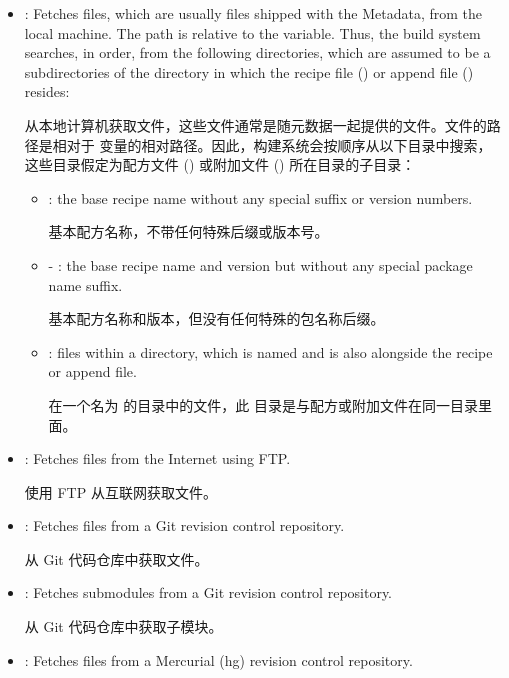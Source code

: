 {\begin{itemize}
\medskip
从 CVS 版本控制代码仓库获取文件。

\item {}: Fetches files, which are usually files shipped with the Metadata, from the local machine. The path is relative to the  variable. Thus, the build system searches, in order, from the following directories, which are assumed to be a subdirectories of the directory in which the recipe file () or append file () resides:

\medskip
从本地计算机获取文件，这些文件通常是随元数据一起提供的文件。文件的路径是相对于  变量的相对路径。因此，构建系统会按顺序从以下目录中搜索，这些目录假定为配方文件 () 或附加文件 () 所在目录的子目录：

\medskip
\begin{itemize}
\setlength\itemsep{1.0em}
\item {}: the base recipe name without any special suffix or version numbers.

\medskip
基本配方名称，不带任何特殊后缀或版本号。

\item {} - : the base recipe name and version but without any special package name suffix.

\medskip
基本配方名称和版本，但没有任何特殊的包名称后缀。

\item {}: files within a directory, which is named  and is also alongside the recipe or append file.

\medskip
在一个名为  的目录中的文件，此  目录是与配方或附加文件在同一目录里面。
\end{itemize}

\item {}: Fetches files from the Internet using FTP.

\medskip
使用 FTP 从互联网获取文件。

\item {}: Fetches files from a Git revision control repository.

\medskip
从 Git 代码仓库中获取文件。

\item {}: Fetches submodules from a Git revision control repository.

\medskip
从 Git 代码仓库中获取子模块。

\item {}: Fetches files from a Mercurial (hg) revision control repository.


\end{itemize}}
